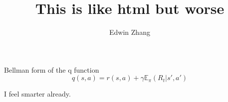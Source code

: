 \documentclass{article}
\title{This is like html but worse}
\author{Edwin Zhang}
\begin{document}

\maketitle
Bellman form of the q function
\begin{equation}
    q(s, a)=r(s, a) + \gamma \mathbb{E}_{\pi}\left(R_{t}| s' , a'\right)
\end{equation}

I feel smarter already.
\end{document}
